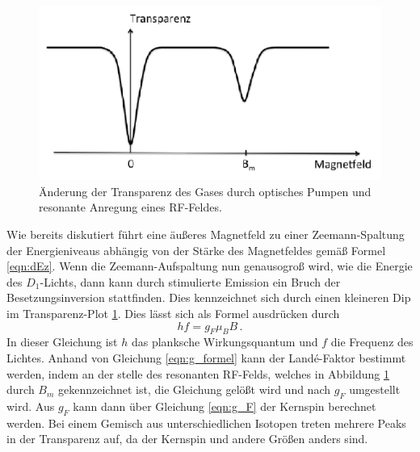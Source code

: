 \begin{figure}
              \centering
              \includegraphics[width = \textwidth]{content/v21_bilder/transparenz.PNG}
              \caption{Änderung der Transparenz des Gases durch optisches Pumpen und resonante Anregung eines RF-Feldes. \cite{v21}}
              \label{fig:transparenz}
\end{figure}

Wie bereits diskutiert führt eine äußeres Magnetfeld zu einer Zeemann-Spaltung der Energieniveaus abhängig von der Stärke des Magnetfeldes gemäß Formel \eqref{eqn:dEz}. 
Wenn die Zeemann-Aufspaltung nun genausogroß wird, wie die Energie des $D_1$-Lichts, dann kann durch stimulierte Emission ein Bruch der Besetzungsinversion stattfinden. 
Dies kennzeichnet sich durch einen kleineren Dip im Transparenz-Plot \ref{fig:transparenz}. Dies lässt sich als Formel ausdrücken durch 
\begin{equation}
              \label{eqn:g_formel}
              hf = g_F\mu_BB \,.
\end{equation}
In dieser Gleichung ist $h$ das planksche Wirkungsquantum und $f$ die Frequenz des Lichtes. Anhand von Gleichung \eqref{eqn:g_formel} kann der Land\'{e}-Faktor bestimmt werden, 
indem an der stelle des resonanten RF-Felds, welches in Abbildung \ref{fig:transparenz} durch $B_m$ gekennzeichnet ist, die Gleichung gelößt wird und nach $g_F$ umgestellt wird.
Aus $g_F$ kann dann über Gleichung \eqref{eqn:g_F} der Kernspin berechnet werden.
Bei einem Gemisch aus unterschiedlichen Isotopen treten mehrere Peaks in der Transparenz auf, da der Kernspin und andere Größen anders sind. 